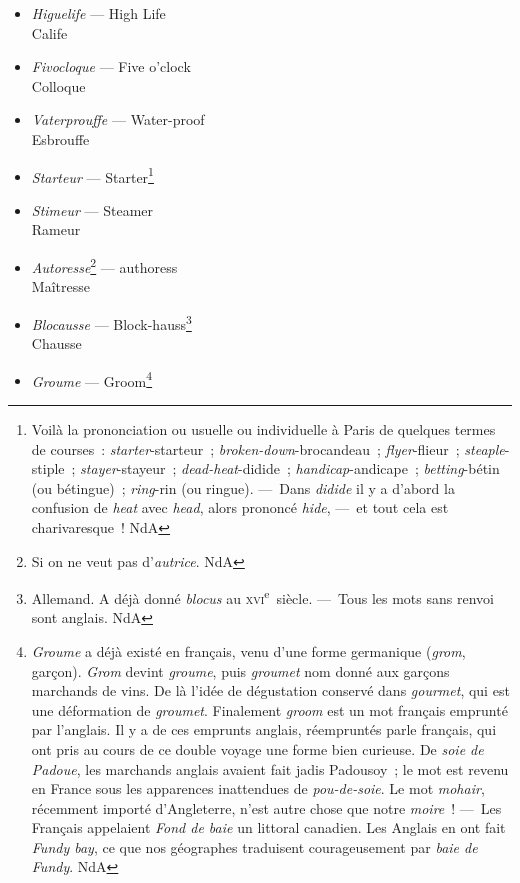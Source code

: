 \documentclass[french,twoside]{book} %
\begin{document}
\begin{itemize}[itemsep=0pt,]
\item {\itshape Higuelife} — High Life \\
Calife
\item {\itshape Fivocloque} — Five o’clock \\
Colloque
\item {\itshape Vaterprouffe} — Water-proof \\
Esbrouffe
\item {\itshape Starteur} — Starter\footnote{ Voilà la prononciation ou usuelle ou individuelle à Paris de quelques termes de courses : {\itshape starter}-starteur ; {\itshape broken-down}-brocandeau ; {\itshape flyer}-flieur ; {\itshape steaple}-stiple ; {\itshape stayer}-stayeur ; {\itshape dead-heat}-didide ; {\itshape handicap}-andicape ; {\itshape betting}-bétin (ou bétingue) ; {\itshape ring}-rin (ou ringue). — Dans {\itshape didide} il y a d’abord la confusion de {\itshape heat} avec {\itshape head}, alors prononcé {\itshape hide}, — et tout cela est charivaresque ! NdA}
\item {\itshape Stimeur} — Steamer \\
Rameur
\item {\itshape Autoresse}\footnote{ Si on ne veut pas d’{\itshape autrice}. NdA} — authoress \\
Maîtresse
\item {\itshape Blocausse} — Block-hauss\footnote{ Allemand. A déjà donné {\itshape blocus} au \textsc{xvi}\textsuperscript{e} siècle. — Tous les mots sans renvoi sont anglais. NdA} \\
Chausse
\item {\itshape Groume} — Groom\footnote{ {\itshape Groume} a déjà existé en français, venu d’une forme germanique ({\itshape grom}, garçon). {\itshape Grom} devint {\itshape groume}, puis {\itshape groumet} nom donné aux garçons marchands de vins. De là l’idée de dégustation conservé dans {\itshape gourmet}, qui est une déformation de {\itshape groumet}. Finalement {\itshape groom} est un mot français emprunté par l’anglais. Il y a de ces emprunts anglais, réempruntés parle français, qui ont pris au cours de ce double voyage une forme bien curieuse. De {\itshape soie de Padoue}, les marchands anglais avaient fait jadis Padousoy ; le mot est revenu en France sous les apparences inattendues de {\itshape pou-de-soie}. Le mot {\itshape mohair}, récemment importé d’Angleterre, n’est autre chose que notre {\itshape moire} ! — Les Français appelaient {\itshape Fond de baie} un littoral canadien. Les Anglais en ont fait {\itshape Fundy bay}, ce que nos géographes traduisent courageusement par {\itshape baie de Fundy}. NdA} \\

\end{itemize}
\end{document}
